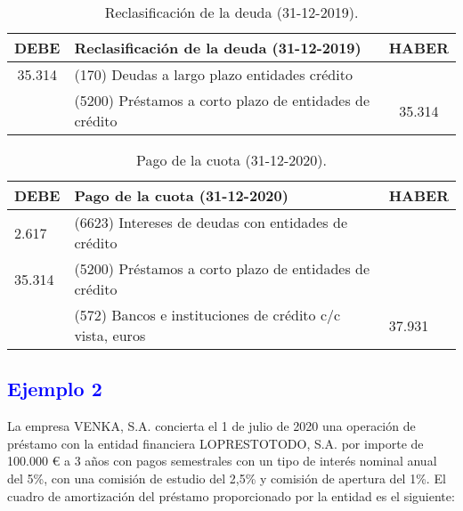 \begin{table}[H]
    \centering
    \begin{tabular}{|c|p{6cm}|c|}
        \hline
        \rowcolor{blue!30}
        \textbf{DEBE} & \textbf{Reclasificación de la deuda (31-12-2019)} & \textbf{HABER} \\
        \hline
        35.314 & (170) Deudas a largo plazo entidades crédito & \\
        \hline
        & (5200) Préstamos a corto plazo de entidades de crédito & 35.314 \\
        \hline
    \end{tabular}
    \caption{Reclasificación de la deuda (31-12-2019).}
    \label{tabla:reclasificacion_deuda_2019}
\end{table}

\begin{table}[H]
    \centering
    \begin{tabular}{|p{2cm}|p{6cm}|p{2cm}|}
        \hline
        \rowcolor{blue!30}
        \textbf{DEBE} & \textbf{Pago de la cuota (31-12-2020)} & \textbf{HABER} \\
        \hline
        2.617 & (6623) Intereses de deudas con entidades de crédito & \\
        \hline
        35.314 & (5200) Préstamos a corto plazo de entidades de crédito & \\
        \hline
        & (572) Bancos e instituciones de crédito c/c vista, euros & 37.931 \\
        \hline
    \end{tabular}
    \caption{Pago de la cuota (31-12-2020).}
    \label{tabla:pago_cuota_2020}
\end{table}
\newpage
\subsection*{\textcolor{blue}{Ejemplo 2}}

La empresa VENKA, S.A. concierta el 1 de julio de 2020 una operación de préstamo con la entidad financiera LOPRESTOTODO, S.A. por importe de 100.000 € a 3 años con pagos semestrales con un tipo de interés nominal anual del 5\%, con una comisión de estudio del 2,5\% y comisión de apertura del 1\%. El cuadro de amortización del préstamo proporcionado por la entidad es el siguiente:

